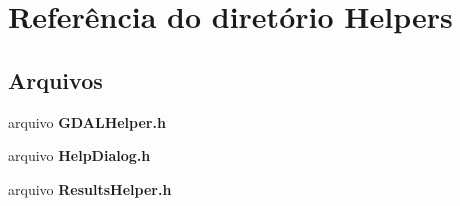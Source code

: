 \section{Referência do diretório Helpers}
\label{dir_7a3001973f12840dd7cae1e668ea95f9}
\subsection*{Arquivos}
\begin{DoxyCompactItemize}
\item 
arquivo {\bf G\+D\+A\+L\+Helper.\+h}
\item 
arquivo {\bf Help\+Dialog.\+h}
\item 
arquivo {\bf Results\+Helper.\+h}
\end{DoxyCompactItemize}
